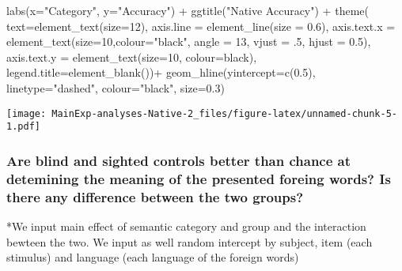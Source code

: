 \documentclass[
]{article}
\newenvironment{Shaded}{\begin{snugshade}}{\end{snugshade}}
\newcommand{\AttributeTok}[1]{\textcolor[rgb]{0.77,0.63,0.00}{#1}}
\newcommand{\DecValTok}[1]{\textcolor[rgb]{0.00,0.00,0.81}{#1}}
\newcommand{\FloatTok}[1]{\textcolor[rgb]{0.00,0.00,0.81}{#1}}
\newcommand{\FunctionTok}[1]{\textcolor[rgb]{0.00,0.00,0.00}{#1}}
\newcommand{\NormalTok}[1]{#1}
\newcommand{\SpecialCharTok}[1]{\textcolor[rgb]{0.00,0.00,0.00}{#1}}
\newcommand{\StringTok}[1]{\textcolor[rgb]{0.31,0.60,0.02}{#1}}
\begin{document}
\begin{Shaded}
\begin{Highlighting}[]
  \FunctionTok{labs}\NormalTok{(}\AttributeTok{x=}\StringTok{"Category"}\NormalTok{, }\AttributeTok{y=}\StringTok{"Accuracy"}\NormalTok{) }\SpecialCharTok{+}
  \FunctionTok{ggtitle}\NormalTok{(}\StringTok{"Native Accuracy"}\NormalTok{) }\SpecialCharTok{+}
  \FunctionTok{theme}\NormalTok{(}
    \AttributeTok{text=}\FunctionTok{element\_text}\NormalTok{(}\AttributeTok{size=}\DecValTok{12}\NormalTok{), }
    \AttributeTok{axis.line =} \FunctionTok{element\_line}\NormalTok{(}\AttributeTok{size =} \FloatTok{0.6}\NormalTok{), }
    \AttributeTok{axis.text.x =} \FunctionTok{element\_text}\NormalTok{(}\AttributeTok{size=}\DecValTok{10}\NormalTok{,}\AttributeTok{colour=}\StringTok{"black"}\NormalTok{,}
                               \AttributeTok{angle =} \DecValTok{13}\NormalTok{,}
                               \AttributeTok{vjust =}\NormalTok{ .}\DecValTok{5}\NormalTok{, }
                               \AttributeTok{hjust =} \FloatTok{0.5}\NormalTok{), }
    \AttributeTok{axis.text.y =} \FunctionTok{element\_text}\NormalTok{(}\AttributeTok{size=}\DecValTok{10}\NormalTok{, }\AttributeTok{colour=}\StringTok{\textquotesingle{}black\textquotesingle{}}\NormalTok{), }
    \AttributeTok{legend.title=}\FunctionTok{element\_blank}\NormalTok{())}\SpecialCharTok{+}
  \FunctionTok{geom\_hline}\NormalTok{(}\AttributeTok{yintercept=}\FunctionTok{c}\NormalTok{(}\FloatTok{0.5}\NormalTok{), }\AttributeTok{linetype=}\StringTok{"dashed"}\NormalTok{, }\AttributeTok{colour=}\StringTok{"black"}\NormalTok{, }\AttributeTok{size=}\FloatTok{0.3}\NormalTok{)}
\end{Highlighting}
\end{Shaded}

\texttt{[image: MainExp-analyses-Native-2\_files/figure-latex/unnamed-chunk-5-1.pdf]}

\hypertarget{are-blind-and-sighted-controls-better-than-chance-at-detemining-the-meaning-of-the-presented-foreing-words-is-there-any-difference-between-the-two-groups}{%
\subsubsection{Are blind and sighted controls better than chance at
detemining the meaning of the presented foreing words? Is there any
difference between the two
groups?}\label{are-blind-and-sighted-controls-better-than-chance-at-detemining-the-meaning-of-the-presented-foreing-words-is-there-any-difference-between-the-two-groups}}

*We input main effect of semantic category and group and the interaction
bewteen the two. We input as well random intercept by subject, item
(each stimulus) and language (each language of the foreign words)
\end{document}
